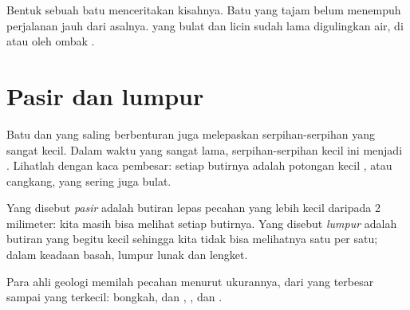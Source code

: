 \begin{remark}\label{rem:g3:stones-pebbles-sand:shape}
Bentuk sebuah batu menceritakan kisahnya. Batu yang tajam belum menempuh
perjalanan jauh dari  asalnya.  yang bulat dan licin sudah
lama digulingkan air, di  atau oleh ombak .
\end{remark}

\section{Pasir dan lumpur}

Batu dan  yang saling berbenturan juga melepaskan
serpihan-serpihan yang sangat kecil. Dalam waktu yang sangat lama,
serpihan-serpihan kecil ini menjadi . Lihatlah  dengan kaca
pembesar: setiap butirnya adalah potongan kecil , atau cangkang,
yang sering juga bulat.

\begin{definition}\label{def:g3:stones-pebbles-sand:sand}
Yang disebut \emph{pasir} adalah butiran lepas pecahan 
yang lebih kecil daripada 2 milimeter: kita masih bisa melihat setiap
butirnya. Yang disebut \emph{lumpur} adalah butiran yang begitu
kecil sehingga kita tidak bisa melihatnya satu per satu; dalam keadaan
basah, lumpur lunak dan lengket.
\end{definition}

Para ahli geologi memilah pecahan  menurut ukurannya, dari yang
terbesar sampai yang terkecil: bongkah,  dan , , dan
.

